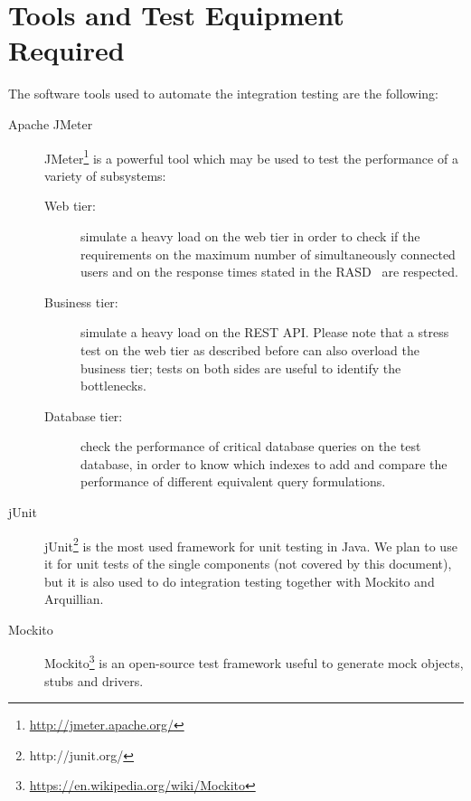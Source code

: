 \chapter{Tools and Test Equipment Required}
\label{chap:tools}

The software tools used to automate the integration testing are the following:
\begin{description}
    \item[Apache JMeter
    ]
    JMeter\footnote{\url{http://jmeter.apache.org/}} is a powerful tool which may be used to test the performance of a variety of subsystems:
    \begin{description}
        \item[Web tier:] simulate a heavy load on the web tier in order to check if the requirements on the maximum number of simultaneously connected users and on the response times stated in the RASD~\cite[p.~57]{mytaxi-rasd} are respected.
        \item[Business tier:] simulate a heavy load on the REST API. Please note that a stress test on the web tier as described before can also overload the business tier; tests on both sides are useful to identify the bottlenecks.
        \item[Database tier:] check the performance of critical database queries on the test database, in order to know which indexes to add and compare the performance of different equivalent query formulations.
    \end{description}

    \item[jUnit] jUnit\footnote{http://junit.org/} is the most used framework for unit testing in Java. We plan to use it for unit tests of the single components (not covered by this document), but it is also used to do integration testing together with Mockito and Arquillian.

    \item[Mockito] Mockito\footnote{\url{https://en.wikipedia.org/wiki/Mockito}} is an open-source test framework useful to generate mock objects, stubs and drivers.

\end{description}
